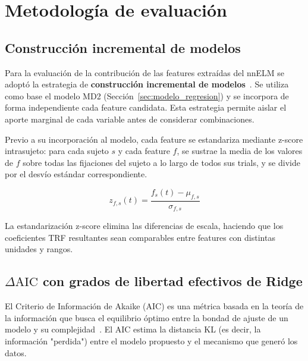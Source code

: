 \section{Metodología de evaluación}
\label{sec:evaluacion}


\subsection{Construcción incremental de modelos}

Para la evaluación de la contribución de las features extraídas del nnELM se adoptó la estrategia de \textbf{construcción incremental de modelos}~\citep{care2025}. Se utiliza como base el modelo MD2 (Sección~\ref{sec:modelo_regresion}) y se incorpora de forma independiente cada feature candidata. Esta estrategia permite aislar el aporte marginal de cada variable antes de considerar combinaciones.

Previo a su incorporación al modelo, cada feature se estandariza mediante z-score intrasujeto: para cada sujeto $s$ y cada feature $f$, se sustrae la media de los valores de $f$ sobre todas las fijaciones del sujeto a lo largo de todos sus trials, y se divide por el desvío estándar correspondiente.

\begin{equation}
    \label{eq:zscore}
    z_{f,s}(t) = \frac{f_s(t) - \mu_{f,s}}{\sigma_{f,s}}
\end{equation}

La estandarización z-score elimina las diferencias de escala, haciendo que los coeficientes TRF resultantes sean comparables entre features con distintas unidades y rangos.

\subsection{$\Delta\mathrm{AIC}$ con grados de libertad efectivos de Ridge}

El Criterio de Información de Akaike (AIC) es una métrica basada en la teoría de la información que busca el equilibrio óptimo entre la bondad de ajuste de un modelo y su complejidad~\citep{akaike1974}. El AIC estima la distancia KL (es decir, la información "perdida") entre el modelo propuesto y el mecanismo que generó los datos.

